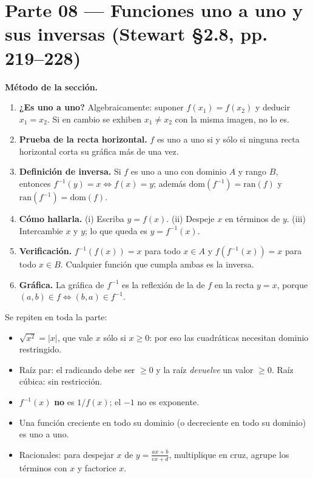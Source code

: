 \documentclass[11pt]{article}
\begin{document}
\section*{Parte 08 --- Funciones uno a uno y sus inversas (Stewart §2.8, pp. 219--228)}

\begin{teo}
\textbf{Método de la sección.}
\begin{enumerate}[nosep,leftmargin=1.6em]
  \item \textbf{¿Es uno a uno?} Algebraicamente: suponer $f(x_1)=f(x_2)$ y deducir $x_1=x_2$. Si en cambio se exhiben $x_1\neq x_2$ con la misma imagen, no lo es.
  \item \textbf{Prueba de la recta horizontal.} $f$ es uno a uno si y sólo si ninguna recta horizontal corta su gráfica más de una vez.
  \item \textbf{Definición de inversa.} Si $f$ es uno a uno con dominio $A$ y rango $B$, entonces $f^{-1}(y)=x \iff f(x)=y$; además $\text{dom}(f^{-1})=\text{ran}(f)$ y $\text{ran}(f^{-1})=\text{dom}(f)$.
  \item \textbf{Cómo hallarla.} (i) Escriba $y=f(x)$. (ii) Despeje $x$ en términos de $y$. (iii) Intercambie $x$ y $y$; lo que queda es $y=f^{-1}(x)$.
  \item \textbf{Verificación.} $f^{-1}(f(x))=x$ para todo $x\in A$ y $f(f^{-1}(x))=x$ para todo $x\in B$. Cualquier función que cumpla ambas es la inversa.
  \item \textbf{Gráfica.} La gráfica de $f^{-1}$ es la reflexión de la de $f$ en la recta $y=x$, porque $(a,b)\in f \iff (b,a)\in f^{-1}$.
\end{enumerate}
\end{teo}

\begin{tip}
Se repiten en toda la parte:
\begin{itemize}[nosep,leftmargin=1.4em]
  \item $\sqrt{x^2}=|x|$, que vale $x$ sólo si $x\ge 0$: por eso las cuadráticas necesitan dominio restringido.
  \item Raíz par: el radicando debe ser $\ge 0$ y la raíz \emph{devuelve} un valor $\ge 0$. Raíz cúbica: sin restricción.
  \item $f^{-1}(x)$ \textbf{no} es $1/f(x)$; el $-1$ no es exponente.
  \item Una función creciente en todo su dominio (o decreciente en todo su dominio) es uno a uno.
  \item Racionales: para despejar $x$ de $y=\frac{ax+b}{cx+d}$, multiplique en cruz, agrupe los términos con $x$ y factorice $x$.
\end{itemize}
\end{tip}
\end{document}
